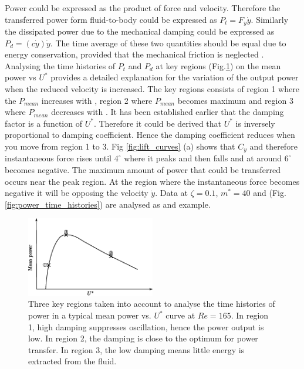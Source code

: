  
 Power could be expressed as the product of force and velocity. Therefore the transferred power form fluid-to-body could be expressed as $P_t=F_y\dot{y}$. Similarly the dissipated power due to the mechanical damping could be expressed as $P_d=(c\dot{y})\dot{y}$. The time average of these two quantities should be equal due to energy conservation, provided that the mechanical friction is neglected . Analysing the  time histories of $P_t $ and $P_d$ at key regions (Fig.\ref{fig:regions_1}) on the mean power vs $U^*$ provides a detailed explanation for the variation of the output power when the reduced velocity is increased. The key regions consists of region 1 where the $P_{mean}$ increases with \ustar, region 2 where $P_{mean}$ becomes maximum and region 3 where $P_{mean}$ decreases with \ustar. It has been established earlier that the damping factor is a function of $U^*$. Therefore it could be derived that $U^*$ is inversely proportional to damping coefficient. Hence the damping coefficient reduces when you move from region 1 to 3. Fig \ref{fig:lift_curves} (a) shows that $C_y$ and therefore instantaneous force rises until $4^\circ$ where it peaks and then falls and at around $6^\circ$ becomes negative. The maximum amount of power that could be transferred occurs near the peak region. At the region where the instantaneous force becomes negative it will be opposing the velocity $\dot{y}$. Data at $\zeta=0.1$, $m^*=40$ and  (Fig.\ref{fig:power_time_histories}) are analysed as and example.  

\begin{figure}[h!]
\centering
\includegraphics[width=0.5\textwidth]{../FnP/sketch_1}
\caption{ Three key regions taken into account to analyse the time histories of power in a typical mean power vs. $U^*$ curve at $Re=165$. In region 1, high damping suppresses oscillation, hence the power output is low. In region 2, the damping is close to the optimum for power transfer. In region 3, the low damping means little energy is extracted from the fluid.}
\label{fig:regions_1}
\end{figure}

